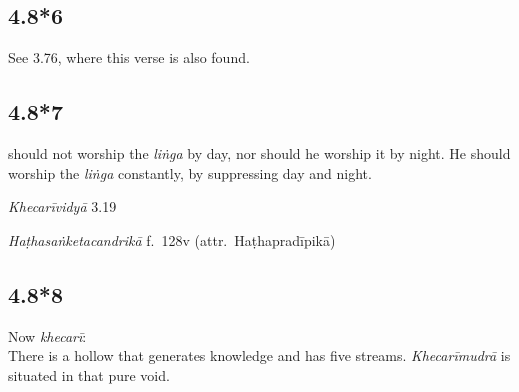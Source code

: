 \begin{ekdosis}
\subsection*{4.8*6}
\begin{philcomm}[hp04_008_6]
See 3.76, where this verse is also found.
\end{philcomm}

\subsection*{4.8*7}
\begin{translation} should not worship the \emph{liṅga} by day, nor should he worship it by night. He should worship the \emph{liṅga} constantly, by suppressing day and night.
\end{translation}

\begin{sources}[hp04_008_7]
\emph{Khecarīvidyā} 3.19
\begin{versinnote}
\end{versinnote}
\end{sources}

\begin{testimonia}[hp04_008_7]
\emph{Haṭhasaṅketacandrikā} f.~128v (attr.~Haṭhapradīpikā)
\begin{versinnote}
\end{versinnote}
\end{testimonia}


\subsection*{4.8*8}
\begin{translation}[hp04_008_8]
Now \emph{khecarī}:\\
There is a hollow that generates knowledge and has five streams. \emph{Khecarīmudrā} is situated in that pure void.
\end{translation}


\end{ekdosis}
